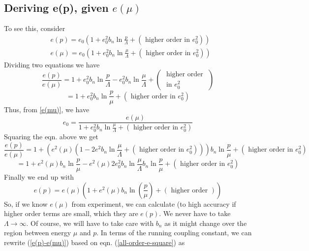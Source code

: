 \subsection{Deriving e(p), given \texorpdfstring{$e(\mu)$}{TEXT}}
 To see this, consider
\begin{equation}\begin{aligned}
&e(p)=e_{0}\left(1+e_{0}^{2} b_{n} \ln \frac{p}{\Lambda}+\left(\text { higher order in } e_{0}^{2}\right)\right)\\
&e(\mu)=e_{0}\left(1+e_{0}^{2} b_{n} \ln \frac{\mu}{\Lambda}+\left(\text { higher order in } e_{0}^{2}\right)\right)
\end{aligned}
\label{e(mu)}
\end{equation}
Dividing two equations we have
$$\frac{e(p)}{e(\mu)}=1+e_{0}^{2} b_{n} \ln \frac{p}{\Lambda}-e_{0}^{2} b_{n} \ln \frac{\mu}{\Lambda}+\left(\begin{array}{c}
\text { higher order } \\
\text { in } e_{0}^{2}
\end{array}\right)$$
$$=1+e_{0}^{2} b_{n} \ln \frac{p}{\mu}+\left(\text { higher order in } e_{0}^{2}\right)$$
Thus, from \ref{e(mu)}, we have
$$e_{0}=\frac{e(\mu)}{1+e_{0}^{2} b_{n} \ln \frac{\mu}{\Lambda}+\left(\text { higher order in } e_{0}^{2}\right)}$$
Squaring the eqn. above we get
$$\frac{e(p)}{e(\mu)}=1+\left(e^{2}(\mu)\left(1-2 e^{2} b_{n} \ln \frac{\mu}{\Lambda}+\left(\text { higher order in } e_{0}^{2}\right)\right)\right)b_{n} \ln \frac{p}{\mu}+\left(\text { higher order in } e_{0}^{2}\right)$$
$$=1+e^{2}(\mu) b_{n} \ln \frac{p}{\mu}-e^{2}(\mu) 2 e_{0}^{2} b_{n} \ln \frac{\mu}{\Lambda} b_{n} \ln \frac{p}{\mu}+\left(\text { higher order in } e_{0}^{2}\right)$$
Finally we end up with
\begin{equation}e(p)=e(\mu)\left(1+e^{2}(\mu) b_{n} \ln(\frac{p}{\mu})+(\text { higher order })\right)
\label{e(p)-e(mu)}
\end{equation}
So, if we know $e(\mu)$ from experiment, we can calculate (to high accuracy if higher order terms are
small, which they are $e(p)$. We never have to take $\Lambda \rightarrow \infty$. Of course, we will have to take care with $b_{n}$ as it might change over the region between energy $\mu$ and $p$. In terms of the running coupling constant, we can rewrite (\ref{e(p)-e(mu)}) based on eqn. (\ref{all-order-e-square}) as
